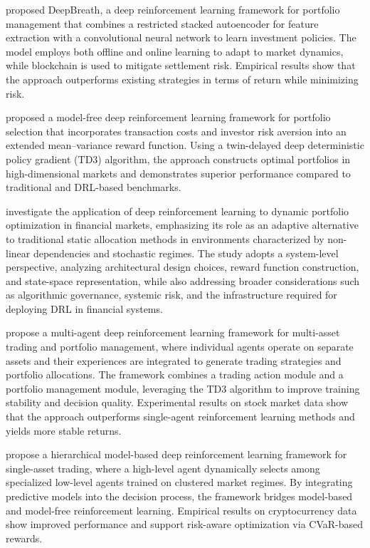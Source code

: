 \documentclass[]{elsarticle}
\begin{document}
\citet{SOLEYMANI2020113456} proposed DeepBreath, a deep reinforcement learning framework for portfolio management that combines a restricted stacked autoencoder for feature extraction with a convolutional neural network to learn investment policies. The model employs both offline and online learning to adapt to market dynamics, while blockchain is used to mitigate settlement risk. Empirical results show that the approach outperforms existing strategies in terms of return while minimizing risk.

\citet{JIANG2024101016} proposed a model-free deep reinforcement learning framework for portfolio selection that incorporates transaction costs and investor risk aversion into an extended mean–variance reward function. Using a twin-delayed deep deterministic policy gradient (TD3) algorithm, the approach constructs optimal portfolios in high-dimensional markets and demonstrates superior performance compared to traditional and DRL-based benchmarks.

\citet{sterling2026deep} investigate the application of deep reinforcement learning to dynamic portfolio optimization in financial markets, emphasizing its role as an adaptive alternative to traditional static allocation methods in environments characterized by non-linear dependencies and stochastic regimes. The study adopts a system-level perspective, analyzing architectural design choices, reward function construction, and state-space representation, while also addressing broader considerations such as algorithmic governance, systemic risk, and the infrastructure required for deploying DRL in financial systems.

\citet{cheng2024multiagent} propose a multi-agent deep reinforcement learning framework for multi-asset trading and portfolio management, where individual agents operate on separate assets and their experiences are integrated to generate trading strategies and portfolio allocations. The framework combines a trading action module and a portfolio management module, leveraging the TD3 algorithm to improve training stability and decision quality. Experimental results on stock market data show that the approach outperforms single-agent reinforcement learning methods and yields more stable returns.

\citet{analytics2030031} propose a hierarchical model-based deep reinforcement learning framework for single-asset trading, where a high-level agent dynamically selects among specialized low-level agents trained on clustered market regimes. By integrating predictive models into the decision process, the framework bridges model-based and model-free reinforcement learning. Empirical results on cryptocurrency data show improved performance and support risk-aware optimization via CVaR-based rewards.
\end{document}
